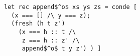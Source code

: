 \begin{figure}[!t]
  \centering
  \begin{minipage}{0.28\textwidth}
    \begin{lstlisting}[label={append}, caption={List concatenation relation}, captionpos=b, frame=tb]
let rec append$^o$ xs ys zs = conde [
  (x === [] /\ y === z);
  (fresh (h t z')
    (x === h :: t /\
     z === h :: z' /\
     append$^o$ t y z') ) ]
    \end{lstlisting}
  \end{minipage}
\end{figure}







